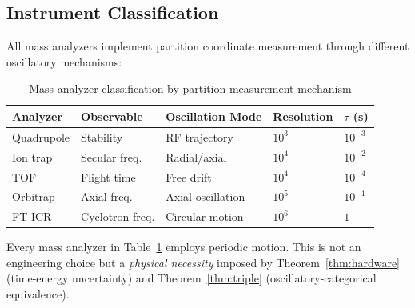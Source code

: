 \subsection{Instrument Classification}

All mass analyzers implement partition coordinate measurement through different oscillatory mechanisms:

\begin{table}[h]
\centering
\caption{Mass analyzer classification by partition measurement mechanism}
\label{tab:instruments}
\begin{tabular}{lllll}
\toprule
\textbf{Analyzer} & \textbf{Observable} & \textbf{Oscillation Mode} & \textbf{Resolution} & \textbf{$\tau$ (s)} \\
\midrule
Quadrupole & Stability & RF trajectory & $10^3$ & $10^{-3}$ \\
Ion trap & Secular freq. & Radial/axial & $10^4$ & $10^{-2}$ \\
TOF & Flight time & Free drift & $10^4$ & $10^{-4}$ \\
Orbitrap & Axial freq. & Axial oscillation & $10^5$ & $10^{-1}$ \\
FT-ICR & Cyclotron freq. & Circular motion & $10^6$ & $1$ \\
\bottomrule
\end{tabular}
\end{table}

\begin{proposition}
\label{prop:universal}
Every mass analyzer in Table~\ref{tab:instruments} employs periodic motion. This is not an engineering choice but a \emph{physical necessity} imposed by Theorem~\ref{thm:hardware} (time-energy uncertainty) and Theorem~\ref{thm:triple} (oscillatory-categorical equivalence).
\end{proposition}

